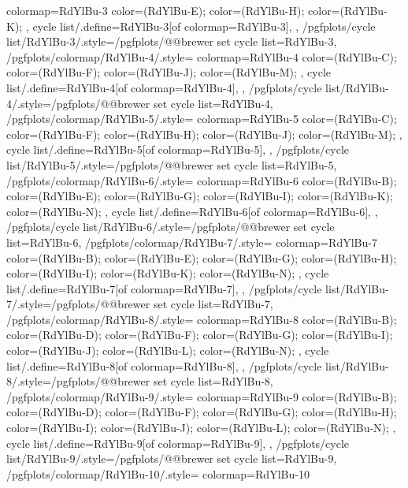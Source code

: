 {{    colormap={RdYlBu-3}{
      color=(RdYlBu-E);
      color=(RdYlBu-H);
      color=(RdYlBu-K);
    },
    cycle list/.define={RdYlBu-3}{[of colormap=RdYlBu-3]},
  },
  /pgfplots/cycle list/RdYlBu-3/.style={/pgfplots/@@brewer set cycle list={RdYlBu-3}},
  /pgfplots/colormap/RdYlBu-4/.style={
    colormap={RdYlBu-4}{
      color=(RdYlBu-C);
      color=(RdYlBu-F);
      color=(RdYlBu-J);
      color=(RdYlBu-M);
    },
    cycle list/.define={RdYlBu-4}{[of colormap=RdYlBu-4]},
  },
  /pgfplots/cycle list/RdYlBu-4/.style={/pgfplots/@@brewer set cycle list={RdYlBu-4}},
  /pgfplots/colormap/RdYlBu-5/.style={
    colormap={RdYlBu-5}{
      color=(RdYlBu-C);
      color=(RdYlBu-F);
      color=(RdYlBu-H);
      color=(RdYlBu-J);
      color=(RdYlBu-M);
    },
    cycle list/.define={RdYlBu-5}{[of colormap=RdYlBu-5]},
  },
  /pgfplots/cycle list/RdYlBu-5/.style={/pgfplots/@@brewer set cycle list={RdYlBu-5}},
  /pgfplots/colormap/RdYlBu-6/.style={
    colormap={RdYlBu-6}{
      color=(RdYlBu-B);
      color=(RdYlBu-E);
      color=(RdYlBu-G);
      color=(RdYlBu-I);
      color=(RdYlBu-K);
      color=(RdYlBu-N);
    },
    cycle list/.define={RdYlBu-6}{[of colormap=RdYlBu-6]},
  },
  /pgfplots/cycle list/RdYlBu-6/.style={/pgfplots/@@brewer set cycle list={RdYlBu-6}},
  /pgfplots/colormap/RdYlBu-7/.style={
    colormap={RdYlBu-7}{
      color=(RdYlBu-B);
      color=(RdYlBu-E);
      color=(RdYlBu-G);
      color=(RdYlBu-H);
      color=(RdYlBu-I);
      color=(RdYlBu-K);
      color=(RdYlBu-N);
    },
    cycle list/.define={RdYlBu-7}{[of colormap=RdYlBu-7]},
  },
  /pgfplots/cycle list/RdYlBu-7/.style={/pgfplots/@@brewer set cycle list={RdYlBu-7}},
  /pgfplots/colormap/RdYlBu-8/.style={
    colormap={RdYlBu-8}{
      color=(RdYlBu-B);
      color=(RdYlBu-D);
      color=(RdYlBu-F);
      color=(RdYlBu-G);
      color=(RdYlBu-I);
      color=(RdYlBu-J);
      color=(RdYlBu-L);
      color=(RdYlBu-N);
    },
    cycle list/.define={RdYlBu-8}{[of colormap=RdYlBu-8]},
  },
  /pgfplots/cycle list/RdYlBu-8/.style={/pgfplots/@@brewer set cycle list={RdYlBu-8}},
  /pgfplots/colormap/RdYlBu-9/.style={
    colormap={RdYlBu-9}{
      color=(RdYlBu-B);
      color=(RdYlBu-D);
      color=(RdYlBu-F);
      color=(RdYlBu-G);
      color=(RdYlBu-H);
      color=(RdYlBu-I);
      color=(RdYlBu-J);
      color=(RdYlBu-L);
      color=(RdYlBu-N);
    },
    cycle list/.define={RdYlBu-9}{[of colormap=RdYlBu-9]},
  },
  /pgfplots/cycle list/RdYlBu-9/.style={/pgfplots/@@brewer set cycle list={RdYlBu-9}},
  /pgfplots/colormap/RdYlBu-10/.style={
    colormap={RdYlBu-10}{
}}}
